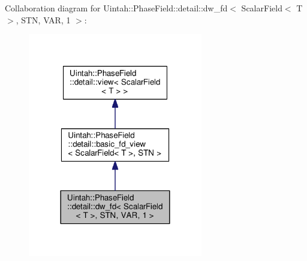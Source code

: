 Collaboration diagram for Uintah\+:\+:Phase\+Field\+:\+:detail\+:\+:dw\+\_\+fd$<$ Scalar\+Field$<$ T $>$, S\+TN, V\+AR, 1 $>$\+:\nopagebreak
\begin{figure}[H]
\begin{center}
\leavevmode
\includegraphics[width=216pt]{classUintah_1_1PhaseField_1_1detail_1_1dw__fd_3_01ScalarField_3_01T_01_4_00_01STN_00_01VAR_00_011_01_4__coll__graph}
\end{center}
\end{figure}
